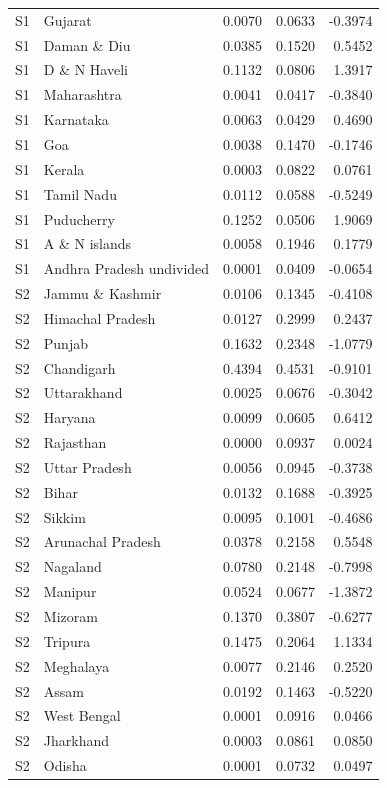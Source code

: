 \documentclass[11pt,a4paper]{report}
\begin{document}
\begin{longtable}{l>{\raggedright\arraybackslash}p{5cm}rrr}
S1 & Gujarat & 0.0070 & 0.0633 & -0.3974 \\
S1 & Daman \& Diu & 0.0385 & 0.1520 & 0.5452 \\
S1 & D \& N Haveli & 0.1132 & 0.0806 & 1.3917 \\
S1 & Maharashtra & 0.0041 & 0.0417 & -0.3840 \\
S1 & Karnataka & 0.0063 & 0.0429 & 0.4690 \\
S1 & Goa & 0.0038 & 0.1470 & -0.1746 \\
S1 & Kerala & 0.0003 & 0.0822 & 0.0761 \\
S1 & Tamil Nadu & 0.0112 & 0.0588 & -0.5249 \\
S1 & Puducherry & 0.1252 & 0.0506 & 1.9069 \\
S1 & A \& N islands & 0.0058 & 0.1946 & 0.1779 \\
S1 & Andhra Pradesh undivided & 0.0001 & 0.0409 & -0.0654 \\
S2 & Jammu \& Kashmir & 0.0106 & 0.1345 & -0.4108 \\
S2 & Himachal Pradesh & 0.0127 & 0.2999 & 0.2437 \\
S2 & Punjab & 0.1632 & 0.2348 & -1.0779 \\
S2 & Chandigarh & 0.4394 & 0.4531 & -0.9101 \\
S2 & Uttarakhand & 0.0025 & 0.0676 & -0.3042 \\
S2 & Haryana & 0.0099 & 0.0605 & 0.6412 \\
S2 & Rajasthan & 0.0000 & 0.0937 & 0.0024 \\
S2 & Uttar Pradesh & 0.0056 & 0.0945 & -0.3738 \\
S2 & Bihar & 0.0132 & 0.1688 & -0.3925 \\
S2 & Sikkim & 0.0095 & 0.1001 & -0.4686 \\
S2 & Arunachal Pradesh & 0.0378 & 0.2158 & 0.5548 \\
S2 & Nagaland & 0.0780 & 0.2148 & -0.7998 \\
S2 & Manipur & 0.0524 & 0.0677 & -1.3872 \\
S2 & Mizoram & 0.1370 & 0.3807 & -0.6277 \\
S2 & Tripura & 0.1475 & 0.2064 & 1.1334 \\
S2 & Meghalaya & 0.0077 & 0.2146 & 0.2520 \\
S2 & Assam & 0.0192 & 0.1463 & -0.5220 \\
S2 & West Bengal & 0.0001 & 0.0916 & 0.0466 \\
S2 & Jharkhand & 0.0003 & 0.0861 & 0.0850 \\
S2 & Odisha & 0.0001 & 0.0732 & 0.0497 \\

\end{longtable}
\end{document}
